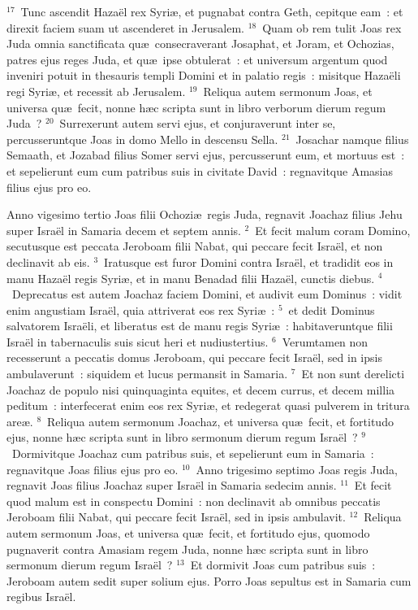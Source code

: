 ${}^{17}$~Tunc ascendit Haza\"el rex Syri\ae , et pugnabat contra Geth, cepitque eam~: et direxit faciem suam ut ascenderet in Jerusalem.
${}^{18}$~Quam ob rem tulit Joas rex Juda omnia sanctificata qu\ae\ consecraverant Josaphat, et Joram, et Ochozias, patres ejus reges Juda, et qu\ae\ ipse obtulerat~: et universum argentum quod inveniri potuit in thesauris templi Domini et in palatio regis~: misitque Haza\"eli regi Syri\ae , et recessit ab Jerusalem.
${}^{19}$~Reliqua autem sermonum Joas, et universa qu\ae\ fecit, nonne h\ae c scripta sunt in libro verborum dierum regum Juda~?
${}^{20}$~Surrexerunt autem servi ejus, et conjuraverunt inter se, percusseruntque Joas in domo Mello in descensu Sella.
${}^{21}$~Josachar namque filius Semaath, et Jozabad filius Somer servi ejus, percusserunt eum, et mortuus est~: et sepelierunt eum cum patribus suis in civitate David~: regnavitque Amasias filius ejus pro eo.

\bchapter
\lettrine[lines=3,image=true,loversize=0.05,lraise=-0.03]{A}{}nno vigesimo tertio Joas filii Ochozi\ae\ regis Juda, regnavit Joachaz filius Jehu super Isra\"el in Samaria decem et septem annis.
${}^{2}$~Et fecit malum coram Domino, secutusque est peccata Jeroboam filii Nabat, qui peccare fecit Isra\"el, et non declinavit ab eis.
${}^{3}$~Iratusque est furor Domini contra Isra\"el, et tradidit eos in manu Haza\"el regis Syri\ae , et in manu Benadad filii Haza\"el, cunctis diebus.
${}^{4}$~Deprecatus est autem Joachaz faciem Domini, et audivit eum Dominus~: vidit enim angustiam Isra\"el, quia attriverat eos rex Syri\ae~:
${}^{5}$~et dedit Dominus salvatorem Isra\"eli, et liberatus est de manu regis Syri\ae~: habitaveruntque filii Isra\"el in tabernaculis suis sicut heri et nudiustertius.
${}^{6}$~Verumtamen non recesserunt a peccatis domus Jeroboam, qui peccare fecit Isra\"el, sed in ipsis ambulaverunt~: siquidem et lucus permansit in Samaria.
${}^{7}$~Et non sunt derelicti Joachaz de populo nisi quinquaginta equites, et decem currus, et decem millia peditum~: interfecerat enim eos rex Syri\ae , et redegerat quasi pulverem in tritura are\ae .
${}^{8}$~Reliqua autem sermonum Joachaz, et universa qu\ae\ fecit, et fortitudo ejus, nonne h\ae c scripta sunt in libro sermonum dierum regum Isra\"el~?
${}^{9}$~Dormivitque Joachaz cum patribus suis, et sepelierunt eum in Samaria~: regnavitque Joas filius ejus pro eo.
${}^{10}$~Anno trigesimo septimo Joas regis Juda, regnavit Joas filius Joachaz super Isra\"el in Samaria sedecim annis.
${}^{11}$~Et fecit quod malum est in conspectu Domini~: non declinavit ab omnibus peccatis Jeroboam filii Nabat, qui peccare fecit Isra\"el, sed in ipsis ambulavit.
${}^{12}$~Reliqua autem sermonum Joas, et universa qu\ae\ fecit, et fortitudo ejus, quomodo pugnaverit contra Amasiam regem Juda, nonne h\ae c scripta sunt in libro sermonum dierum regum Isra\"el~?
${}^{13}$~Et dormivit Joas cum patribus suis~: Jeroboam autem sedit super solium ejus. Porro Joas sepultus est in Samaria cum regibus Isra\"el.


